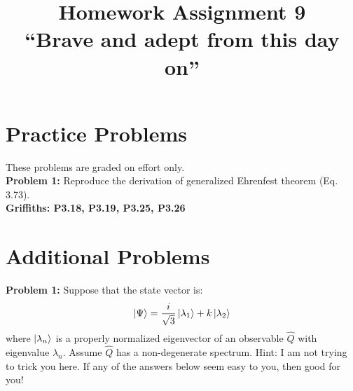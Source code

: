 \documentclass[12pt]{article}
\begin{document}
\newcommand{\ihbar}{\ensuremath{i \hbar}}
\newcommand{\dPsidt}{\ensuremath{ \frac{\partial \Psi}{\partial t} }}
\newcommand{\dPsidx}{\ensuremath{ \frac{\partial \Psi}{\partial x} }}
\newcommand{\ddPsidx}{\ensuremath{ \frac{\partial^2 \Psi}{\partial x^2} }}
\newcommand{\dPssdt}{\ensuremath{ \frac{\partial \Psi^*}{\partial t} }}
\newcommand{\dPssdx}{\ensuremath{ \frac{\partial \Psi^*}{\partial x} }}
\newcommand{\ddPssdx}{\ensuremath{ \frac{\partial^2 \Psi^*}{\partial x^2} }}

\newcommand{\dphidt}{\ensuremath{ \frac{d \phi}{dt} }}
\newcommand{\dpsidx}{\ensuremath{ \frac{d \psi}{dx} }}
\newcommand{\ddpsidx}{\ensuremath{ \frac{d^2 \psi}{dx^2} }}


\date{\vspace{-5ex}}

\title{Homework Assignment 9 \\ ``Brave and adept from this day on''}

\maketitle

\section*{Practice Problems}

These problems are graded on effort only.\\

\noindent
{\bf Problem 1:} Reproduce the derivation of generalized Ehrenfest theorem (Eq. 3.73).\\[5pt]

\noindent
{\bf Griffiths: P3.18, P3.19, P3.25, P3.26} \\
  
\section*{Additional Problems}

\noindent
{\bf Problem 1:} Suppose that the state vector is:
$$\ket{\Psi} = \frac{i}{\sqrt{3}} \ket{\lambda_1} + k \ket{\lambda_2}$$
where $\ket{\lambda_n}$ is a properly normalized eigenvector of an observable $\hat{Q}$ with eigenvalue $\lambda_n$.  Assume $\hat{Q}$ has a non-degenerate spectrum.  Hint:  I am not trying to trick you here.  If any of the answers below seem easy to you, then good for you!\\[5pt]
\end{document}
